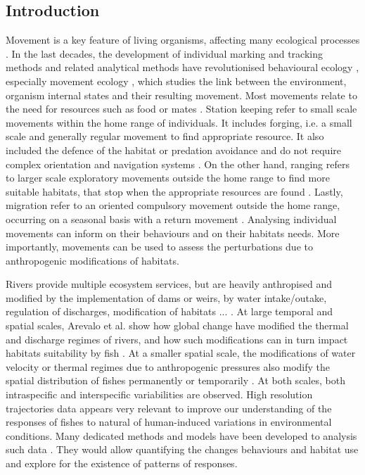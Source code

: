 \documentclass{article}
\begin{document}
\begin{linenumbers}

\begin{abstract}
\end{abstract}


\section{Introduction}

Movement is a key feature of living organisms, affecting many ecological processes \cite{nathan2008a}. In the last decades, the development of individual marking and tracking methods and related analytical methods \cite{jonsen2013} have revolutionised behavioural ecology \cite{cagnacci2010}, especially movement ecology \cite{nathan}, which studies the link between the environment, organism internal states and their resulting movement. 
Most movements relate to the need for resources such as food or mates \cite{dingle2007}. Station keeping refer to small scale movements within the home range of individuals. It includes forging, i.e. a small scale and generally regular movement to find appropriate resource. It also included the defence of the habitat or predation avoidance and do not require complex orientation and navigation systems \cite{dingle2006}. On the other hand, ranging refers to larger scale exploratory movements outside the home range to find more suitable habitats, that stop when the appropriate resources are found \cite{jander1975}. Lastly, migration refer to an oriented compulsory movement outside the home range, occurring on a seasonal basis with a return movement \cite{dingle2007}. Analysing individual movements can inform on their behaviours and on their habitats needs. More importantly, movements can be used to assess the perturbations due to anthropogenic modifications of habitats.

Rivers provide multiple ecosystem services, but are heavily anthropised and modified by the implementation of dams or weirs, by water intake/outake, regulation of discharges, modification of habitats ... \cite{postel2003}. At large temporal and spatial scales, Arevalo et al. \cite{arevalo2020a} show how global change have modified the thermal and discharge regimes of rivers, and how such modifications can in turn impact habitats suitability by fish \cite{arevalo2021a}\cite{arevalo2021b}. At a smaller spatial scale, the modifications of water velocity or thermal regimes due to anthropogenic pressures also modify the spatial distribution of fishes permanently or temporarily  \cite{lamouroux2006}\cite{capra2017}. At both scales, both intraspecific and interspecific variabilities are observed. High resolution trajectories data appears very relevant to improve our understanding of the responses of fishes to natural of human-induced variations in environmental conditions. Many dedicated methods and models have been developed to analysis such data \cite{joo2013}\cite{jonsen2013}\cite{nathan}\cite{gurarie2016}. They would allow quantifying the changes behaviours and habitat use and explore for the existence of patterns of responses. 


\end{linenumbers}
\end{document}
